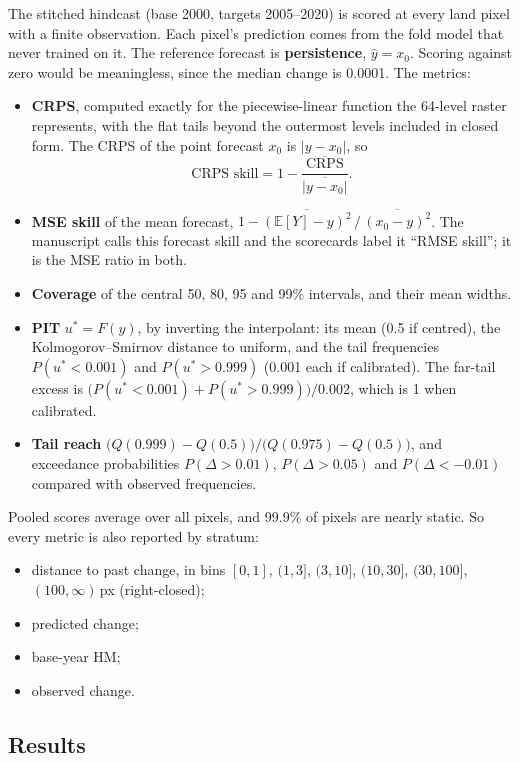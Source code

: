\documentclass[11pt,a4paper]{article}
\newcommand{\E}{\mathbb{E}}
\begin{document}
The stitched hindcast (base 2000, targets 2005--2020) is scored at every land pixel with a finite
observation. Each pixel's prediction comes from the fold model that never trained on it. The
reference forecast is \textbf{persistence}, $\hat y = x_0$. Scoring against zero would be
meaningless, since the median change is 0.0001. The metrics:
\begin{itemize}
\item \textbf{CRPS}, computed exactly for the piecewise-linear function the 64-level raster
  represents, with the flat tails beyond the outermost levels included in closed form. The CRPS
  of the point forecast $x_0$ is $|y-x_0|$, so
  \[
  \text{CRPS skill} = 1 - \frac{\overline{\mathrm{CRPS}}}{\overline{|y-x_0|}}.
  \]
\item \textbf{MSE skill} of the mean forecast, $1-\overline{(\E[Y]-y)^2}\,/\,\overline{(x_0-y)^2}$.
  The manuscript calls this forecast skill and the scorecards label it ``RMSE skill''; it is
  the MSE ratio in both.
\item \textbf{Coverage} of the central 50, 80, 95 and 99\% intervals, and their mean widths.
\item \textbf{PIT} $u^*=F(y)$, by inverting the interpolant: its mean (0.5 if centred), the
  Kolmogorov--Smirnov distance to uniform, and the tail frequencies $P(u^*<0.001)$ and
  $P(u^*>0.999)$ (0.001 each if calibrated). The far-tail excess is
  $\big(P(u^*<0.001)+P(u^*>0.999)\big)/0.002$, which is 1 when calibrated.
\item \textbf{Tail reach} $\big(Q(0.999)-Q(0.5)\big)/\big(Q(0.975)-Q(0.5)\big)$, and exceedance
  probabilities $P(\Delta>0.01)$, $P(\Delta>0.05)$ and $P(\Delta<-0.01)$ compared with observed
  frequencies.
\end{itemize}
Pooled scores average over all pixels, and 99.9\% of pixels are nearly static. So every metric is
also reported by stratum:
\begin{itemize}
\item distance to past change, in bins $[0,1]$, $(1,3]$, $(3,10]$, $(10,30]$, $(30,100]$, $(100,\infty)$\,px
  (right-closed);
\item predicted change;
\item base-year HM;
\item observed change.
\end{itemize}

\subsection{Results}
\end{document}
